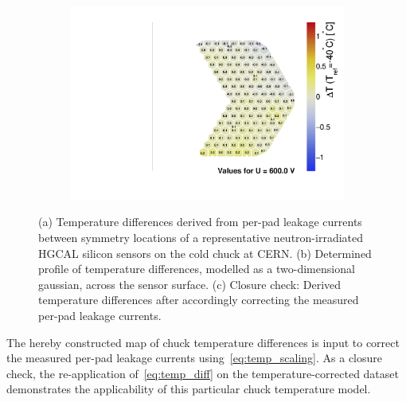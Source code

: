 \begin{figure}
\begin{subfigure}[b]{0.32\textwidth}
		\includegraphics[width=0.999\textwidth]{plots/chuck_temp_correction/Spring2021_ALPS_chucktempcorrected.pdf}
		\subcaption{
		}
		\label{plot:chucktemp_after}
	\end{subfigure}
	\caption{
		(a) Temperature differences derived from per-pad leakage currents between symmetry locations of a representative neutron-irradiated HGCAL silicon sensors on the cold chuck at CERN.
		(b) Determined profile of temperature differences, modelled as a two-dimensional gaussian, across the sensor surface.
		(c) Closure check: Derived temperature differences after accordingly correcting the measured per-pad leakage currents.
	}
\end{figure}
The hereby constructed map of chuck temperature differences is input to correct the measured per-pad leakage currents using~\ref{eq:temp_scaling}.
As a closure check, the re-application of~\ref{eq:temp_diff} on the temperature-corrected dataset demonstrates the applicability of this particular chuck temperature model.
